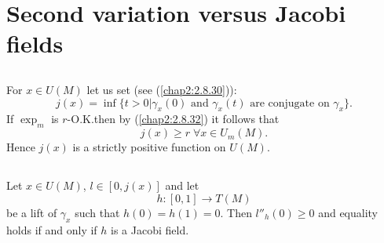 \section{Second variation versus Jacobi fields}\label{chap8:sec2}

\subsection{}\label{chap8:8.2.1}

\begin{notation*}
For $x\in U(M)$ let us set (see (\ref{chap2:2.8.30})):
$$
j(x)=\inf\{t>0|\gamma_{x}(0)\text{ \  and \ }\gamma_{x}(t)\text{ \ are
  conjugate on \ } \gamma_{x}\}.
$$
If $\exp_{m}$ is $r$-O.K.\@ then by (\ref{chap2:2.8.32}) it follows that
$$
j(x)\geq r \; \forall x\in U_{m}(M).
$$
Hence $j(x)$ is a strictly positive function on $U(M)$.
\end{notation*}


\subsection{}\label{chap8:8.2.2}

\begin{prop*}
Let $x\in U(M)$, $l\in [0,j(x)]$ and let
$$
h:[0,1]\to T(M)
$$
be a lift of $\gamma_{x}$ such that $h(0)=h(1)=0$. Then
$l''_{h}(0)\geq 0$ and equality holds if and only if $h$ is a Jacobi field.
\end{prop*}


